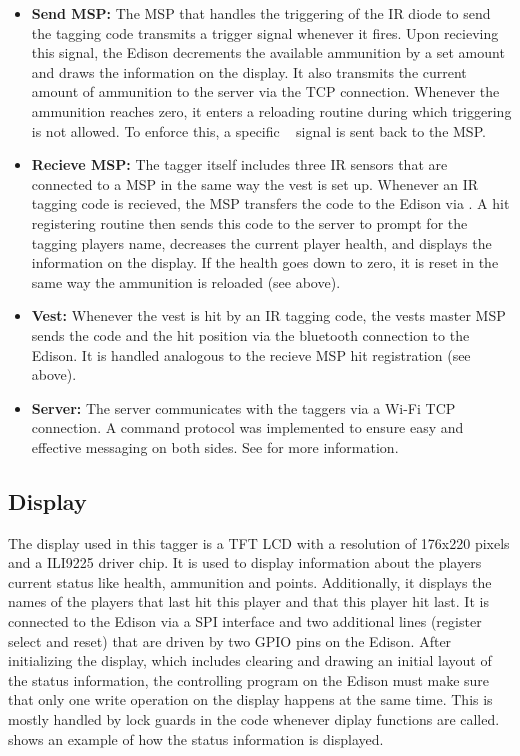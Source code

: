 \begin{itemize}
	\item \textbf{Send MSP:} The MSP that handles the triggering of the IR diode to send the tagging code transmits a trigger signal whenever it fires. Upon recieving this signal, the Edison decrements the available ammunition by a set amount and draws the information on the display. It also transmits the current amount of ammunition to the server via the TCP connection. Whenever the ammunition reaches zero, it enters a reloading routine during which triggering is not allowed. To enforce this, a specific \isqc~ signal is sent back to the MSP.
	\item \textbf{Recieve MSP:} The tagger itself includes three IR sensors that are connected to a MSP in the same way the vest is set up. Whenever an IR tagging code is recieved, the MSP transfers the code to the Edison via \isqc. A hit registering routine then sends this code to the server to prompt for the tagging players name, decreases the current player health, and displays the information on the display. If the health goes down to zero, it is reset in the same way the ammunition is reloaded (see above).
	\item \textbf{Vest:} Whenever the vest is hit by an IR tagging code, the vests master MSP sends the code and the hit position via the bluetooth connection to the Edison. It is handled analogous to the recieve MSP hit registration (see above).
	\item \textbf{Server:} The server communicates with the taggers via a Wi-Fi TCP connection. A command protocol was implemented to ensure easy and effective messaging on both sides. See  for more information.
\end{itemize}

\subsection{Display}
The display used in this tagger is a  TFT LCD with a resolution of 176x220 pixels and a ILI9225 driver chip. It is used to display information about the players current status like health, ammunition and points. Additionally, it displays the names of the players that last hit this player and that this player hit last. It is connected to the Edison via a SPI interface and two additional lines (register select and reset) that are driven by two GPIO pins on the Edison. After initializing the display, which includes clearing and drawing an initial layout of the status information, the controlling program on the Edison must make sure that only one write operation on the display happens at the same time. This is mostly handled by lock guards in the code whenever diplay functions are called.  shows an example of how the status information is displayed.

